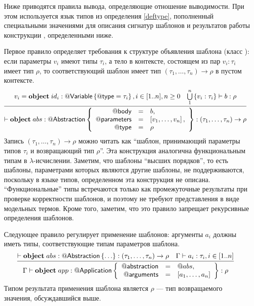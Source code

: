 Ниже приводятся правила вывода, определяющие отношение выводимости. При этом используется язык типов из определения \ref{deftype}, пополненный специальными значениями для описания сигнатур шаблонов и результатов работы конструкции , определенными ниже. 

Первое правило определяет требования к структуре объявления шаблона (класс ): если параметры $v_i$ имеют типы $\tau_i$, а тело в контексте, состоящем из пар $v_i : \tau_i$ имеет тип $\rho$, то соответствующий шаблон имеет тип $(\tau_1, \ldots, \tau_n) \rightarrow \rho$ в пустом контексте.
{\small
$$
\trule{
	v_i = \Object{id_i}{\RefSt{Variable}}{\RefSt{type} = \tau_i}, i \in [1..n], n \ge 0
	&
	\bigcup\limits_1^n \left\{ v_i : \tau_i \right\} \vdash b : \rho
}{
	\vdash \Object{abs}{\RefSt{Abstraction}}{
		\begin{array}{rcl}
			\RefSt{body} &=& b,\\
			\RefSt{parameters} &=& \List{v_1, \ldots, v_n},\\
			\RefSt{type} &=& \rho\\
		\end{array}	
	} : (\tau_1, \ldots, \tau_n) \rightarrow \rho
}{}
$$}
Запись $(\tau_1, \ldots, \tau_n) \rightarrow \rho$ можно читать как ``шаблон, принимающий параметры типов $\tau_i$ и возвращающий тип $\rho$''. Эта конструкция аналогична функциональным типам в $\lambda$-исчислении. Заметим, что шаблоны ``высших порядков'', то есть шаблоны, параметрами которых являются другие шаблоны, не поддерживаются, поскольку в языке типов, определенном  эта конструкция не описана. ``Функциональные'' типы встречаются только как промежуточные результаты при проверке корректности шаблонов, и поэтому не требуют представления в виде модельных термов. Кроме того, заметим, что это правило запрещает рекурсивные определения шаблонов.

Следующее правило регулирует применение шаблонов: аргументы $a_i$ должны иметь типы, соответствующие типам параметров шаблона.
{\small
$$
\trule{
	\vdash \Object{abs}{\RefSt{Abstraction}}{\ldots
	} : (\tau_1, \ldots, \tau_n) \rightarrow \rho
	&
	\Gamma \vdash a_i : \tau_i, i \in [1..n]
}{
	\Gamma \vdash
		\Object{app}{\RefSt{Application}}{
			\begin{array}{rcl}
				\RefSt{abstraction} &=& \Ref{abs},\\
				\RefSt{arguments} &=& \List{a_1, \ldots, a_n}
			\end{array}	
		}
	: \rho
}{}
$$}
Типом результата применения шаблона является $\rho$ --- тип возвращаемого значения, обсуждавшийся выше.


